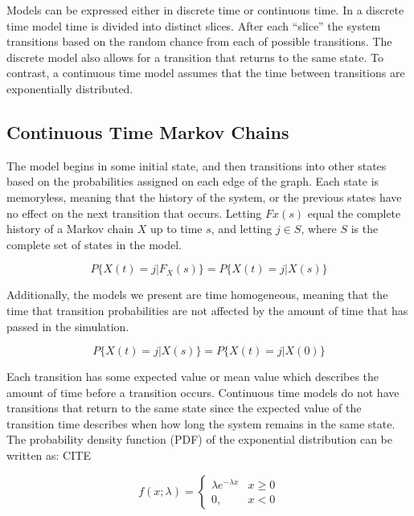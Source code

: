 Models can be expressed either in discrete time or continuous time. In a discrete time model
time is divided into distinct slices. After each ``slice'' the system transitions
based on the random chance from each of possible transitions. The discrete model
also allows for a transition that returns to the same state. To contrast, a continuous time model assumes that the time between transitions
are exponentially distributed. 

\subsection{Continuous Time Markov Chains}

The model begins in some initial state, and then transitions into other states based on the probabilities assigned on each edge of the graph. Each state is memoryless, meaning that the history of the system, or the previous states have no effect on the next transition that occurs. Letting $Fx(s)$ equal the complete history of a Markov chain $X$ up to time $s$, and letting $j \in S$, where $S$ is the complete set of states in the model.

\begin{equation}
P\{ X(t)=j | F_X(s) \} = P\{ X(t)=j | X(s) \}
\end{equation}

Additionally, the models we present are time homogeneous, meaning that the time that transition probabilities are not affected by the amount of time that has passed in the simulation. 

\begin{equation}
P\{ X(t)=j | X(s) \} = P\{ X(t)=j | X(0) \}
\end{equation}


Each transition has some expected value or mean
value which describes the amount of time before a transition occurs. Continuous
time models do not have transitions that return to the same state since the
expected value of the transition time describes when how long the system 
remains in the same state. The probability density
function (PDF) of the exponential distribution can be written as: CITE

\begin{equation}
f(x;\lambda) = \begin{cases}
\lambda e^{-\lambda x} & x \ge 0 \\
0, & x < 0
\end{cases}
\end{equation}


